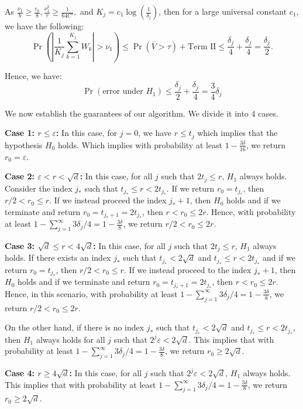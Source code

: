 As $ \frac{\nu_1}{b}\geq\frac{c_0}{8}, 
\frac{\nu_1^2}{\tau} \geq\frac{1}{64C'}, $ and $ K_j = c_1 \log \left( \frac{1}{\delta_j} \right)$, then for a large universal constant $c_1$, we have the following:
\[
\Pr\left( \left| \frac{1}{K_j} \sum_{k=1}^{K_j} W_k \right| > \nu_1 \right)\leq \Pr(\bar{V}>\tau) +\text{Term II}\leq \frac{\delta_j}{4}+\frac{\delta_j}{4}=\frac{\delta_j}{2}.
\]


Hence, we have:
\[
\Pr(\text{error under } H_1) \leq \frac{\delta_j}{2}+\frac{\delta_j}{4}= \frac{3}{4} \delta_j
\]

We now establish the guarantees of our algorithm. We divide it into $4$ cases.

\textbf{Case 1: $r\leq \varepsilon$:} In this case, for $j=0$, we have $r\leq t_j$ which implies that the hypothesis $H_0$ holds. Which implies with probability at least $1-\frac{3\delta}{16}$, we return $r_0=\varepsilon$.

\textbf{Case 2: $\varepsilon<r< \sqrt{d}$:} In this case, for all $j$ such that $2t_j\leq r$, $H_1$ always holds. Consider the index $j_*$ such that $t_{j_*}\leq r<2t_{j_*}$. If we return $r_0=t_{j_*}$, then $r/2<r_0\leq r$. If we instead proceed the index $j_*+1$, then $H_0$ holds and if we terminate and return $r_0=t_{j_*+1}=2t_{j_*}$, then $r<r_0\leq 2r$. Hence, with probability at least $1-\sum_{j=1}^\infty 3\delta_j/4=1-\frac{3\delta}{8}$, we return $r/2<r_0\leq 2r$.

\textbf{Case 3: $\sqrt{d}\leq r<4\sqrt{d}$:} In this case, for all $j$ such that $2t_j\leq r$, $H_1$ always holds. If there exists an index $j_*$ such that $t_{j_*}<2\sqrt{d}$ and $t_{j_*}\leq r<2t_{j_*}$ and if we return $r_0=t_{j_*}$, then $r/2<r_0\leq r$. If we instead proceed to the index $j_*+1$, then $H_0$ holds and if we terminate and return $r_0=t_{j_*+1}=2t_{j_*}$, then $r<r_0\leq 2r$. Hence, in this scenario, with probability at least $1-\sum_{j=1}^\infty 3\delta_j/4=1-\frac{3\delta}{8}$, we return $r/2<r_0\leq 2r$.

On the other hand, if there is no index $j_*$ such that $t_{j_*}<2\sqrt{d}$ and $t_{j_*}\leq r<2t_{j_*}$, then $H_1$ always holds for all $j$ such that $2^j\varepsilon<2\sqrt{d}$. This implies that with probability at least $1-\sum_{j=1}^\infty 3\delta_j/4=1-\frac{3\delta}{8}$, we return $r_0\geq 2\sqrt{d}$.

\textbf{Case 4: $r\geq 4\sqrt{d}$:} In this case, for all $j$ such that $2^j\varepsilon<2\sqrt{d}$, $H_1$ always holds. This implies that with probability at least $1-\sum_{j=1}^\infty 3\delta_j/4=1-\frac{3\delta}{8}$, we return $r_0\geq 2\sqrt{d}$.

